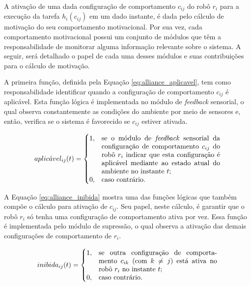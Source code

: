         A ativação de uma dada configuração de comportamento $c_{ij}$ do robô $r_i$ para a execução da tarefa $h_i(c_{ij})$ em um dado instante, é dada pelo cálculo de motivação do seu comportamento motivacional. Por sua vez, cada comportamento motivacional possui um conjunto de módulos que têm a responsabilidade de monitorar alguma informação relevante sobre o sistema. A seguir, será detalhado o papel de cada uma desses módulos e suas contribuições para o cálculo de motivação.
        
        A primeira função, definida pela Equação \ref{eq:alliance_aplicavel}, tem como responsabilidade identificar quando a configuração de comportamento $c_{ij}$ é aplicável. Esta função lógica é implementada no módulo de \textit{feedback} sensorial, o qual observa constantemente as condições do ambiente por meio de sensores e, então, verifica se o sistema é favorecido se $c_{ij}$ estiver ativada.
        
        \begin{equation} \label{eq:alliance_aplicavel}
            aplic\acute{a}vel_{ij}(t) =
            \begin{cases}
                1, & \parbox[t]{.5\textwidth}{se o módulo de \textit{feedback} sensorial da configuração de comportamento $c_{ij}$ do robô $r_i$ indicar que esta configuração é aplicável mediante ao estado atual do ambiente no instante $t$;} \\
                0, & \text{caso contrário.}
            \end{cases}
        \end{equation}
        
        A Equação \ref{eq:alliance_inibida} mostra uma das funções lógicas que também compõe o cálculo para ativação de $c_{ij}$. Seu papel, neste cálculo, é garantir que o robô $r_i$ só tenha uma configuração de comportamento ativa por vez. Essa função é implementada pelo módulo de supressão, o qual observa a ativação das demais configurações de comportamento de $r_i$. 
        
        \begin{equation} \label{eq:alliance_inibida}
            inibida_{ij}(t) =
            \begin{cases}
                1, & \parbox[t]{.5\textwidth}{se outra configuração de comportamento $c_{ik}$ (com $k \neq j$) está ativa no robô $r_i$ no instante $t$;} \\
                0, & \text{caso contrário.}
            \end{cases}
        \end{equation}
        
